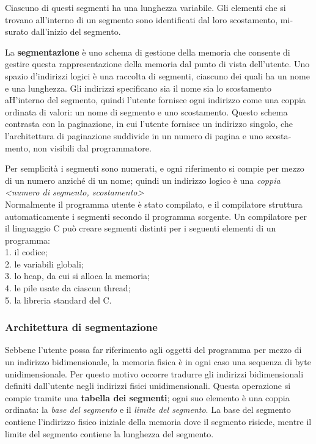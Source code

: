 \documentclass[11pt,a4paper]{article}
\begin{document}
Ciascuno di questi segmenti ha una lunghezza variabile. Gli
elementi che si trovano all'interno di un segmento sono identificati dal loro scostamento, mi­surato dall'inizio del segmento.

La \textbf{segmentazione} è uno schema di gestione della memoria che consente di gestire
questa rappresentazione della memoria dal punto di vista dell'utente. Uno spazio d'indirizzi
logici è una raccolta di segmenti, ciascuno dei quali ha un nome e una lunghezza. Gli indi­rizzi specificano sia il nome sia lo scostamento aH'interno del segmento, quindi l'utente for­nisce ogni indirizzo come una coppia ordinata di valori: un nome di segmento e uno scosta­mento. Questo schema contrasta con la paginazione, in cui l'utente fornisce un indirizzo
singolo, che l'architettura di paginazione suddivide in un numero di pagina e uno scosta­mento, non visibili dal programmatore.

Per semplicità i segmenti sono numerati, e ogni riferimento si compie per mezzo di un
numero anziché di un nome; quindi un indirizzo logico è una \emph{coppia}\medskip\\
\emph{<numero di segmento, scostamento>}\medskip\\
Normalmente il programma utente è stato compilato, e il compilatore struttura automati­camente i segmenti secondo il programma sorgente. Un compilatore per il linguaggio C
può creare segmenti distinti per i seguenti elementi di un programma:\\
1. il codice;\\
2. le variabili globali;\\
3. lo heap, da cui si alloca la memoria;\\
4. le pile usate da ciascun thread;\\
5. la libreria standard del C.

\subsubsection{Architettura di segmentazione}
Sebbene l'utente possa far riferimento agli oggetti del programma per mezzo di un indirizzo
bidimensionale, la memoria fisica è in ogni caso una sequenza di byte unidimensionale. Per
questo motivo occorre tradurre gli indirizzi bidimensionali definiti dall'utente negli indiriz­zi fisici unidimensionali. Questa operazione si compie tramite una \textbf{tabella dei segmenti};
ogni suo elemento è una coppia ordinata: la \emph{base del segmento} e il \emph{limite del segmento}. La ba­se del segmento contiene l'indirizzo fisico iniziale della memoria dove il segmento risiede,
mentre il limite del segmento contiene la lunghezza del segmento.
\end{document}
